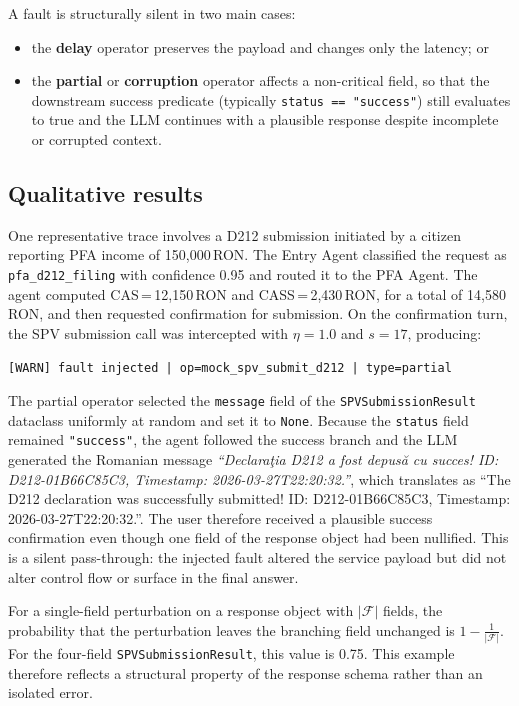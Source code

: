 \documentclass[3p,times,procedia]{elsarticle}
\begin{document}
A fault is structurally silent in two main cases:
\begin{itemize}
    \item the \textbf{delay} operator preserves the payload and changes only the latency; or
    \item the \textbf{partial} or \textbf{corruption} operator affects a non-critical field, so that the downstream success predicate (typically \texttt{status == "success"}) still evaluates to true and the LLM continues with a plausible response despite incomplete or corrupted context.
\end{itemize}

\subsection{Qualitative results}
\label{subsec:qualitative}

One representative trace involves a D212 submission initiated by a citizen reporting PFA income of 150{,}000\,RON. The Entry Agent classified the request as \texttt{pfa\_d212\_filing} with confidence 0.95 and routed it to the PFA Agent. The agent computed CAS\,=\,12{,}150\,RON and CASS\,=\,2{,}430\,RON, for a total of 14{,}580\,RON, and then requested confirmation for submission. On the confirmation turn, the SPV submission call was intercepted with $\eta = 1.0$ and $s = 17$, producing:

\begin{center}
\small\texttt{[WARN] fault injected | op=mock\_spv\_submit\_d212 | type=partial}
\end{center}

The partial operator selected the \texttt{message} field of the \texttt{SPVSubmissionResult} dataclass uniformly at random and set it to \texttt{None}. Because the \texttt{status} field remained \texttt{"success"}, the agent followed the success branch and the LLM generated the Romanian message \emph{``Declara\c{t}ia D212 a fost depus\u{a} cu succes! ID: D212-01B66C85C3, Timestamp: 2026-03-27T22:20:32.''}, which translates as ``The D212 declaration was successfully submitted! ID: D212-01B66C85C3, Timestamp: 2026-03-27T22:20:32.''. The user therefore received a plausible success confirmation even though one field of the response object had been nullified. This is a silent pass-through: the injected fault altered the service payload but did not alter control flow or surface in the final answer.

For a single-field perturbation on a response object with $|\mathcal{F}|$ fields, the probability that the perturbation leaves the branching field unchanged is $1 - \frac{1}{|\mathcal{F}|}$. For the four-field \texttt{SPVSubmissionResult}, this value is 0.75. This example therefore reflects a structural property of the response schema rather than an isolated error.
\end{document}
